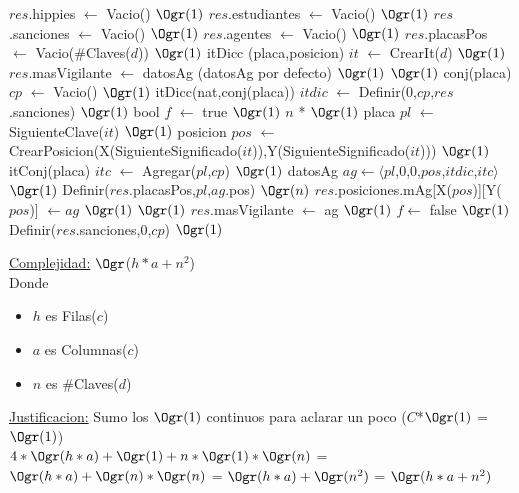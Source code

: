 \begin{Algoritmos}
\begin{algorithm}[H]
\begin{algorithmic}[1]
	\State $res$.hippies $\gets$ Vacio() \Comment $\Ogr(1)$
	\State $res$.estudiantes $\gets$ Vacio() \Comment $\Ogr(1)$
	\State $res$.sanciones $\gets$ Vacio() \Comment $\Ogr(1)$
	\State $res$.agentes $\gets$ Vacio() \Comment $\Ogr(1)$
	\State $res$.placasPos $\gets$ Vacio($\#$Claves($d$)) \Comment $\Ogr(1)$ %
	\State itDicc
	(placa,posicion) $it$ $\gets$ CrearIt($d$) \Comment $\Ogr(1)$
	\State $res$.masVigilante $\gets$ datosAg \Comment (datosAg por defecto) $\Ogr(1)$ 
	 \Comment $\Ogr(1)$
		\State conj(placa) $cp$ $\gets$ Vacio() \Comment $\Ogr(1)$
		\State itDicc(nat,conj(placa)) $itdic$ $\gets$ Definir(0,$cp$,$res$.sanciones) \Comment $\Ogr(1)$
		\State bool $f$ $\gets$ true \Comment $\Ogr(1)$
		 \Comment $n$ * $\Ogr(1)$
	 	\State placa $pl$ $\gets$ SiguienteClave($it$) \Comment $\Ogr(1)$
	 	\State posicion $pos$ $\gets$ CrearPosicion(X(SiguienteSignificado($it$)),Y(SiguienteSignificado($it$))) \Comment $\Ogr(1)$
	 	\State itConj(placa) $itc$ $\gets$ Agregar($pl$,$cp$) \Comment $\Ogr(1)$
	 	\State datosAg $ag \gets \langle pl$,0,0,$pos$,$itdic$,$itc \rangle$ \Comment $\Ogr(1)$
	 	\State Definir($res$.placasPos,$pl$,$ag$.pos) \Comment $\Ogr(n)$
	 	\State $res$.posiciones.mAg[X($pos$)][Y($pos$)] $\gets ag$ \Comment $\Ogr(1)$
	 	 \Comment $\Ogr(1)$
	 		\State $res$.masVigilante $\gets$ ag \Comment $\Ogr(1)$
	 		\State $f \gets$ false \Comment $\Ogr(1)$
	 	\EndIf
	 \EndWhile
	 \State Definir($res$.sanciones,0,$cp$) \Comment $\Ogr(1)$ %
	 \EndIf
\EndProcedure
\end{algorithmic}

\underline{Complejidad:} $\Ogr$($h*a + n^2$)\\
Donde 
\begin{itemize}
	\item $h$ es Filas($c$)
	\item $a$ es Columnas($c$)
	\item $n$ es $\#$Claves($d$)
\end{itemize}	
\underline{Justificacion:} Sumo los $\Ogr(1)$ continuos para aclarar un poco ($C$*$\Ogr(1)$ = $\Ogr(1)$)\\
$4*\Ogr(h*a) + \Ogr(1) + n * \Ogr(1) * \Ogr(n)$ = $\Ogr(h*a) + \Ogr(n)*\Ogr(n)$ = $\Ogr(h*a) + \Ogr(n^2)$ = $\Ogr(h*a + n^2)$
\end{algorithm}



\end{Algoritmos}
